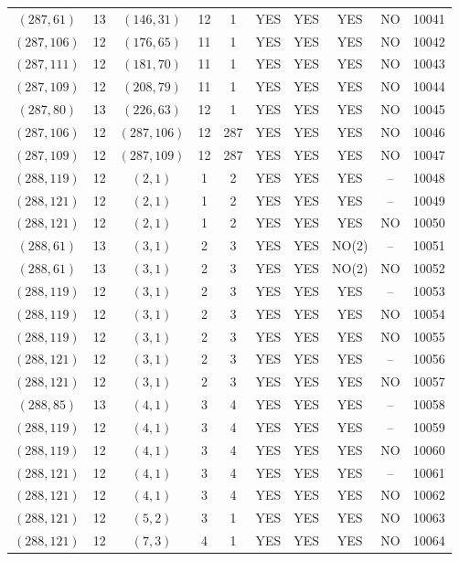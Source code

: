 \begin{longtable}{|c|c|c|c|c|c|c|c|c|c|}
$(287, 61)$ & 13 & $(146, 31)$ & 12 & 1 & YES & YES & YES & NO & 10041\\
$(287, 106)$ & 12 & $(176, 65)$ & 11 & 1 & YES & YES & YES & NO & 10042\\
$(287, 111)$ & 12 & $(181, 70)$ & 11 & 1 & YES & YES & YES & NO & 10043\\
$(287, 109)$ & 12 & $(208, 79)$ & 11 & 1 & YES & YES & YES & NO & 10044\\
$(287, 80)$ & 13 & $(226, 63)$ & 12 & 1 & YES & YES & YES & NO & 10045\\
$(287, 106)$ & 12 & $(287, 106)$ & 12 & 287 & YES & YES & YES & NO & 10046\\
$(287, 109)$ & 12 & $(287, 109)$ & 12 & 287 & YES & YES & YES & NO & 10047\\
$(288, 119)$ & 12 & $(2, 1)$ & 1 & 2 & YES & YES & YES & -- & 10048\\
$(288, 121)$ & 12 & $(2, 1)$ & 1 & 2 & YES & YES & YES & -- & 10049\\
$(288, 121)$ & 12 & $(2, 1)$ & 1 & 2 & YES & YES & YES & NO & 10050\\
$(288, 61)$ & 13 & $(3, 1)$ & 2 & 3 & YES & YES & NO(2) & -- & 10051\\
$(288, 61)$ & 13 & $(3, 1)$ & 2 & 3 & YES & YES & NO(2) & NO & 10052\\
$(288, 119)$ & 12 & $(3, 1)$ & 2 & 3 & YES & YES & YES & -- & 10053\\
$(288, 119)$ & 12 & $(3, 1)$ & 2 & 3 & YES & YES & YES & NO & 10054\\
$(288, 119)$ & 12 & $(3, 1)$ & 2 & 3 & YES & YES & YES & NO & 10055\\
$(288, 121)$ & 12 & $(3, 1)$ & 2 & 3 & YES & YES & YES & -- & 10056\\
$(288, 121)$ & 12 & $(3, 1)$ & 2 & 3 & YES & YES & YES & NO & 10057\\
$(288, 85)$ & 13 & $(4, 1)$ & 3 & 4 & YES & YES & YES & -- & 10058\\
$(288, 119)$ & 12 & $(4, 1)$ & 3 & 4 & YES & YES & YES & -- & 10059\\
$(288, 119)$ & 12 & $(4, 1)$ & 3 & 4 & YES & YES & YES & NO & 10060\\
$(288, 121)$ & 12 & $(4, 1)$ & 3 & 4 & YES & YES & YES & -- & 10061\\
$(288, 121)$ & 12 & $(4, 1)$ & 3 & 4 & YES & YES & YES & NO & 10062\\
$(288, 121)$ & 12 & $(5, 2)$ & 3 & 1 & YES & YES & YES & NO & 10063\\
$(288, 121)$ & 12 & $(7, 3)$ & 4 & 1 & YES & YES & YES & NO & 10064\\

\end{longtable}
